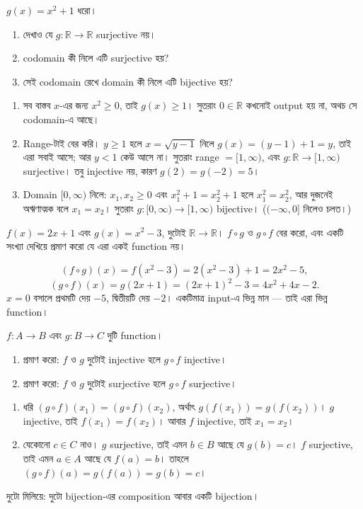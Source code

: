 \documentclass[11pt]{article}
\begin{document}
 $g(x) = x^2 + 1$ ধরো।
\begin{enumerate}
  \item দেখাও যে $g \colon \mathbb{R} \to \mathbb{R}$ surjective নয়।
  \item codomain কী নিলে এটি surjective হয়?
  \item সেই codomain রেখে domain কী নিলে এটি bijective হয়?
\end{enumerate}

\begin{sol}
\begin{enumerate}
  \item সব বাস্তব $x$-এর জন্য $x^2 \geq 0$, তাই $g(x) \geq 1$। সুতরাং
        $0 \in \mathbb{R}$ কখনোই output হয় না, অথচ সে codomain-এ আছে।
  \item Range-টাই বের করি। $y \geq 1$ হলে $x = \sqrt{y - 1}$ নিলে
        $g(x) = (y-1) + 1 = y$, তাই এরা সবাই আসে; আর $y < 1$ কেউ আসে না।
        সুতরাং range $= [1, \infty)$, এবং $g \colon \mathbb{R} \to
        [1, \infty)$ surjective। তবু injective নয়, কারণ $g(2) = g(-2) = 5$।
  \item Domain $[0, \infty)$ নিলে: $x_1, x_2 \geq 0$ এবং $x_1^2 + 1 =
        x_2^2 + 1$ হলে $x_1^2 = x_2^2$, আর দুজনেই অঋণাত্মক বলে $x_1 = x_2$।
        সুতরাং $g \colon [0, \infty) \to [1, \infty)$ bijective।
        ($(-\infty, 0]$ নিলেও চলত।)
\end{enumerate}
\end{sol}

 $f(x) = 2x + 1$ এবং $g(x) = x^2 - 3$, দুটোই $\mathbb{R} \to
\mathbb{R}$। $f \circ g$ ও $g \circ f$ বের করো, এবং একটি সংখ্যা দেখিয়ে
প্রমাণ করো যে এরা একই function নয়।

\begin{sol}
\[
  (f \circ g)(x) = f(x^2 - 3) = 2(x^2 - 3) + 1 = 2x^2 - 5 ,
\]
\[
  (g \circ f)(x) = g(2x + 1) = (2x+1)^2 - 3 = 4x^2 + 4x - 2 .
\]
$x = 0$ বসালে প্রথমটি দেয় $-5$, দ্বিতীয়টি দেয় $-2$। একটিমাত্র input-এ
ভিন্ন মান --- তাই এরা ভিন্ন function।
\end{sol}

 $f \colon A \to B$ এবং $g \colon B \to C$ দুটি function।
\begin{enumerate}
  \item প্রমাণ করো: $f$ ও $g$ দুটোই injective হলে $g \circ f$ injective।
  \item প্রমাণ করো: $f$ ও $g$ দুটোই surjective হলে $g \circ f$ surjective।
\end{enumerate}

\begin{sol}
\begin{enumerate}
  \item ধরি $(g \circ f)(x_1) = (g \circ f)(x_2)$, অর্থাৎ
        $g(f(x_1)) = g(f(x_2))$। $g$ injective, তাই $f(x_1) = f(x_2)$।
        আবার $f$ injective, তাই $x_1 = x_2$।
  \item যেকোনো $c \in C$ নাও। $g$ surjective, তাই এমন $b \in B$ আছে যে
        $g(b) = c$। $f$ surjective, তাই এমন $a \in A$ আছে যে $f(a) = b$।
        তাহলে $(g \circ f)(a) = g(f(a)) = g(b) = c$।
\end{enumerate}

দুটো মিলিয়ে: দুটো bijection-এর composition আবার একটি bijection।
\end{sol}
\end{document}
